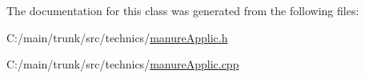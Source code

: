The documentation for this class was generated from the following files:\begin{DoxyCompactItemize}
\item 
C:/main/trunk/src/technics/\hyperlink{manure_applic_8h}{manureApplic.h}\item 
C:/main/trunk/src/technics/\hyperlink{manure_applic_8cpp}{manureApplic.cpp}\end{DoxyCompactItemize}
